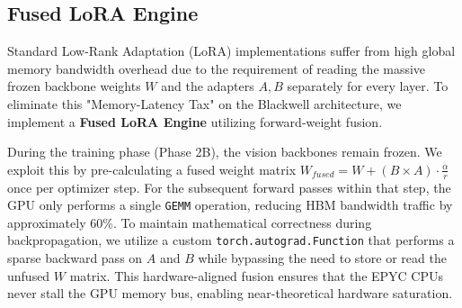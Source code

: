 \documentclass[10pt,twocolumn,letterpaper]{article}
\begin{document}
\subsection{Fused LoRA Engine}
Standard Low-Rank Adaptation (LoRA) implementations suffer from high global memory bandwidth overhead due to the requirement of reading the massive frozen backbone weights $W$ and the adapters $A, B$ separately for every layer. To eliminate this "Memory-Latency Tax" on the Blackwell architecture, we implement a \textbf{Fused LoRA Engine} utilizing forward-weight fusion. 

During the training phase (Phase 2B), the vision backbones remain frozen. We exploit this by pre-calculating a fused weight matrix $W_{fused} = W + (B \times A) \cdot \frac{\alpha}{r}$ once per optimizer step. For the subsequent forward passes within that step, the GPU only performs a single \texttt{GEMM} operation, reducing HBM bandwidth traffic by approximately 60\%. To maintain mathematical correctness during backpropagation, we utilize a custom \texttt{torch.autograd.Function} that performs a sparse backward pass on $A$ and $B$ while bypassing the need to store or read the unfused $W$ matrix. This hardware-aligned fusion ensures that the EPYC CPUs never stall the GPU memory bus, enabling near-theoretical hardware saturation.
\end{document}
